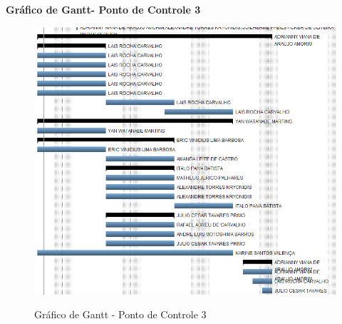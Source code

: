   \pagebreak
  \textbf{Gráfico de Gantt- Ponto de Controle 3}
   \begin{figure}[!h]
    \centering
    \includegraphics[scale = 0.5]{editaveis/figuras/ganttPC3}
    \label{Gráfico de Gantt PC3}
    \caption{Gráfico de Gantt - Ponto de Controle 3}
   \end{figure}
   \FloatBarrier